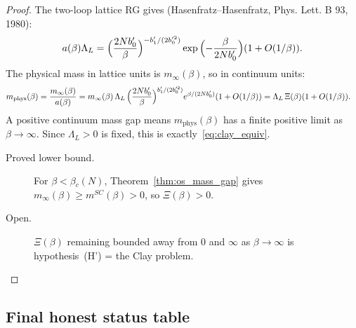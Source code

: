 \begin{proof}
The two-loop lattice RG gives (Hasenfratz--Hasenfratz, Phys. Lett. B 93, 1980):
\begin{equation}
\label{eq:rg_a}
  a(\beta{})\Lambda{}_L
  = \Bigl(\frac{2Nb_0'}{\beta{}}\Bigr)^{-b_1'/(2b_0'^2)}
    \exp{}\Bigl(-\frac{\beta{}}{2Nb_0'}\Bigr)(1+O(1/\beta{})).
\end{equation}
The physical mass in lattice units is $m_{\infty{}}(\beta{})$, so in continuum units:
\begin{align*}
  m_{\mathrm{phys}}(\beta{})
  &= \frac{m_{\infty{}}(\beta{})}{a(\beta{})}
  = m_{\infty{}}(\beta{})\,{}\Lambda{}_L\,{}\Bigl(\frac{2Nb_0'}{\beta{}}\Bigr)^{b_1'/(2b_0'^2)}
    e^{\beta{}/(2Nb_0')}(1+O(1/\beta{}))
  = \Lambda{}_L\,{}\Xi{}(\beta{})(1+O(1/\beta{})).
\end{align*}
A positive continuum mass gap means $m_{\mathrm{phys}}(\beta{})$ has a finite positive limit as $\beta{}\to{}\infty{}$.
Since $\Lambda{}_L>0$ is fixed, this is exactly~\eqref{eq:clay_equiv}.
\begin{description}
\item[Proved lower bound.] For $\beta{}<\beta{}_c(N)$,
Theorem~\ref{thm:os_mass_gap} gives $m_{\infty{}}(\beta{})\ge{} m^{SC}(\beta{})>0$, so $\Xi{}(\beta{})>0$.
\item[Open.] $\Xi{}(\beta{})$ remaining bounded away from 0 and $\infty{}$ as $\beta{}\to{}\infty{}$
is hypothesis~(H') = the Clay problem.
\end{description}
\end{proof}

\subsection{Final honest status table}
\label{ssec:honest212}

